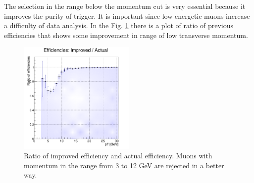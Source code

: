 The selection in the range below the momentum cut is very essential because it improves the purity of trigger.
It is important since low-energetic muons increase a difficulty of data analysis.
In the Fig. \ref{ratio} there is a plot of ratio of previous efficiencies that shows some improvement in range of low transverse momentum.

\begin{figure}[ht]
\centering
\includegraphics[width=0.5\textwidth]{Ratio16.png}
\caption{Ratio of improved efficiency and actual efficiency. Muons with momentum in the range from 3 to 12 GeV are rejected in a better way.}
\label{ratio}
\end{figure} 

